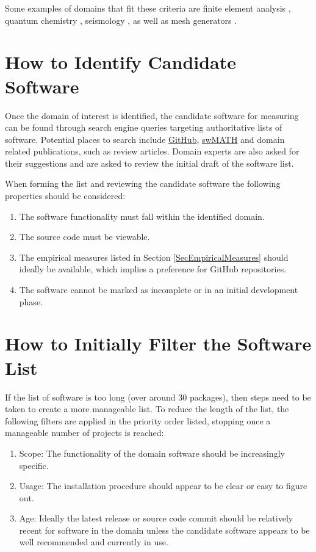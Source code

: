 \documentclass[letterpaper,cleveref]{lipics-v2019}
\theoremstyle{definition}
\begin{document}
Some examples of domains that fit these criteria are finite element analysis
\citep{szabo1996finite}, quantum chemistry \citep{veryazov20042molcas},
seismology \citep{SmithEtAl2018}, as well as mesh generators
\citep{smith2016state}.

\section{How to Identify Candidate Software} \label{SecIdentifyCandSoft}

Once the domain of interest is identified, the candidate software for measuring
can be found through search engine queries targeting authoritative lists of
software.  Potential places to search include \href{https://github.com/}
{GitHub}, \href{https://swmath.org/} {swMATH} and domain related publications,
such as review articles. Domain experts are also asked for their suggestions and
are asked to review the initial draft of the software list.  

When forming the list and reviewing the candidate software the following
properties should be considered:

\begin{enumerate}
\item The software functionality must fall within the identified domain.
\item The source code must be viewable.
\item The empirical measures listed in Section \ref{SecEmpiricalMeasures} should
  ideally be available, which implies a preference for GitHub repositories.
\item The software cannot be marked as incomplete or in an initial development
  phase.
\end{enumerate}

\section{How to Initially Filter the Software List} \label{SecInitialFilter}

If the list of software is too long (over around 30 packages), then steps need
to be taken to create a more manageable list. To reduce the length of the list,
the following filters are applied in the priority order listed, stopping once
a manageable number of projects is reached:

\begin{enumerate}
\item Scope: The functionality of the domain software should be increasingly
  specific.
\item Usage: The installation procedure should appear to be clear or easy to
  figure out.
\item Age: Ideally the latest release or source code commit should be relatively
  recent for software in the domain unless the candidate software appears to be
  well recommended and currently in use.
\end{enumerate}
\end{document}
